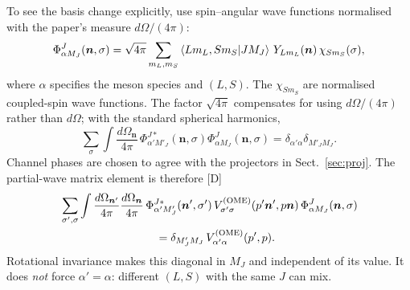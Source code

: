 \documentclass[11pt,a4paper]{article}
\newcommand{\tagD}{\textcolor{orange!85!black}{\textsf{\small[D]}}}
\newcommand{\VOME}{V^{\rm (OME)}}
\newcommand{\vn}{\bm n}
\begin{document}
To see the basis change explicitly, use spin--angular wave functions normalised with the paper's measure $d\Omega/(4\pi)$:
\begin{equation}
\Phi_{\alpha M_J}^{J}(\vn,\sigma)
=\sqrt{4\pi}\sum_{m_L,m_S}
\braket{L m_L,S m_S|J M_J}\,
Y_{L m_L}(\vn)\,\chi_{S m_S}(\sigma),
\label{eq:pw-wavefunction}
\end{equation}
where $\alpha$ specifies the meson species and $(L,S)$. The $\chi_{S m_S}$ are normalised coupled-spin wave functions. The factor $\sqrt{4\pi}$ compensates for using $d\Omega/(4\pi)$ rather than $d\Omega$; with the standard spherical harmonics,
\[
\sum_\sigma\int\frac{d\Omega_{\vn}}{4\pi}\,
\Phi_{\alpha' M'_J}^{J*}(\vn,\sigma)
\Phi_{\alpha M_J}^{J}(\vn,\sigma)
=\delta_{\alpha'\alpha}\delta_{M'_J M_J}.
\]
Channel phases are chosen to agree with the projectors in Sect.~\ref{sec:proj}. The partial-wave matrix element is therefore \tagD
\begin{equation}
\begin{split}
&\sum_{\sigma',\sigma}\int\frac{d\Omega_{\vn'}}{4\pi}
\frac{d\Omega_{\vn}}{4\pi}\,
\Phi_{\alpha' M'_J}^{J*}(\vn',\sigma')\,
\VOME_{\sigma'\sigma}(p'\vn',p\vn)\,
\Phi_{\alpha M_J}^{J}(\vn,\sigma)\\
&\hspace{3cm}=\delta_{M'_J M_J}\,
\VOME_{\alpha'\alpha}(p',p).
\end{split}
\label{eq:pw-basis-change}
\end{equation}
Rotational invariance makes this diagonal in $M_J$ and independent of its value. It does \emph{not} force $\alpha'=\alpha$: different $(L,S)$ with the same $J$ can mix.
\end{document}
